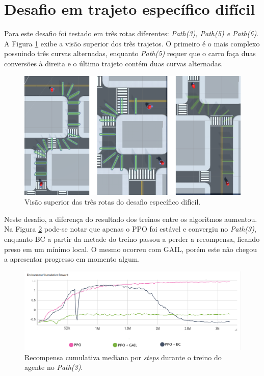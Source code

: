 \section{Desafio em trajeto específico difícil}
Para este desafio foi testado em três rotas diferentes: \textit{Path(3), Path(5) e Path(6)}. A Figura \ref{fig:trajetos-desafio-dificil} exibe a visão superior dos três trajetos. O primeiro é o mais complexo possuindo três curvas alternadas, enquanto \textit{Path(5)} requer que o carro faça duas conversões à direita e o último trajeto contém duas curvas alternadas. 

\begin{figure}[h]
    \centering
    \includegraphics{figs/treinos/desafio-dificil/rotas.png}
    \caption{Visão superior das três rotas do desafio específico difícil.}
    \label{fig:trajetos-desafio-dificil}
\end{figure}

Neste desafio, a diferença do resultado dos treinos entre os algoritmos aumentou. Na Figura \ref{fig:result-desafio-2-path-3} pode-se notar que apenas o PPO foi estável e convergiu no \textit{Path(3)}, enquanto BC a partir da metade do treino passou a perder a recompensa, ficando preso em um mínimo local. O mesmo ocorreu com GAIL, porém este não chegou a apresentar progresso em momento algum. 

\begin{figure}[h]
    \centering
    \includegraphics[scale=0.35]{figs/treinos/desafio-dificil/path-3_recompensas-algos.png}
    \caption{Recompensa cumulativa mediana por \textit{steps} durante o treino do agente no \textit{Path(3)}.}
    \label{fig:result-desafio-2-path-3}
\end{figure}

